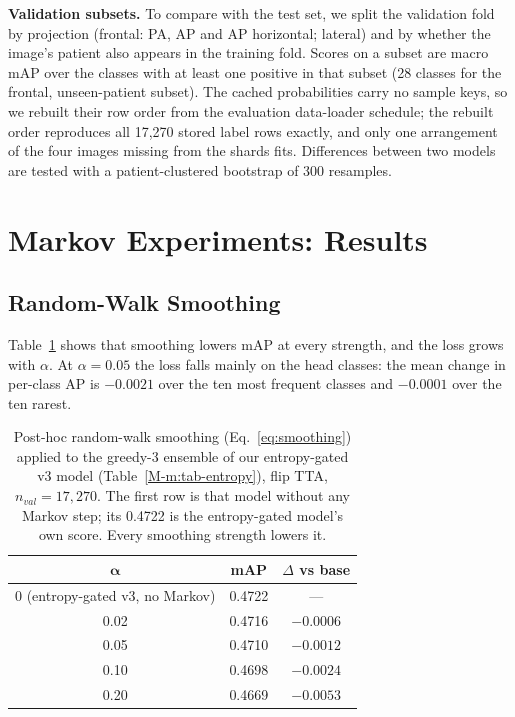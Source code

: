 \documentclass[conference]{IEEEtran}
\begin{document}
\textbf{Validation subsets.} To compare with the test set, we split the validation fold by projection (frontal: PA, AP and AP horizontal; lateral) and by whether the image's patient also appears in the training fold. Scores on a subset are macro mAP over the classes with at least one positive in that subset (28 classes for the frontal, unseen-patient subset). The cached probabilities carry no sample keys, so we rebuilt their row order from the evaluation data-loader schedule; the rebuilt order reproduces all 17,270 stored label rows exactly, and only one arrangement of the four images missing from the shards fits. Differences between two models are tested with a patient-clustered bootstrap of 300 resamples.


\section{Markov Experiments: Results}
\label{s:mkres}

\subsection{Random-Walk Smoothing}
Table~\ref{tab:smoothing} shows that smoothing lowers mAP at every strength, and the loss grows with $\alpha$. At $\alpha = 0.05$ the loss falls mainly on the head classes: the mean change in per-class AP is $-0.0021$ over the ten most frequent classes and $-0.0001$ over the ten rarest.

\begin{table}[htbp]
\caption{Post-hoc random-walk smoothing (Eq.~\eqref{eq:smoothing}) applied to the greedy-3 ensemble of our entropy-gated v3 model (Table~\ref{M-m:tab-entropy}), flip TTA, $n_{val} = 17{,}270$. The first row is that model without any Markov step; its 0.4722 is the entropy-gated model's own score. Every smoothing strength lowers it.}
\begin{center}
\begin{tabular}{|c|c|c|}
\hline
$\boldsymbol{\alpha}$ & \textbf{mAP} & \textbf{$\Delta$ vs base} \\
\hline
0 (entropy-gated v3, no Markov) & 0.4722 & --- \\
\hline
0.02 & 0.4716 & $-0.0006$ \\
\hline
0.05 & 0.4710 & $-0.0012$ \\
\hline
0.10 & 0.4698 & $-0.0024$ \\
\hline
0.20 & 0.4669 & $-0.0053$ \\
\hline
\end{tabular}
\label{tab:smoothing}
\end{center}
\end{table}
\end{document}
